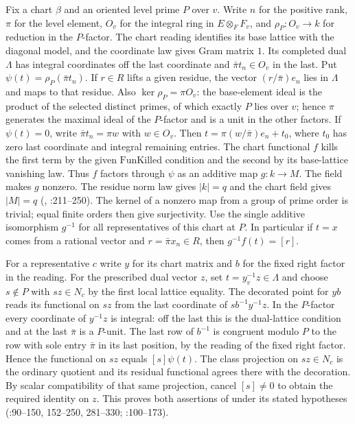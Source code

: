 Fix a chart $\beta$ and an oriented level prime $P$ over $v$.
Write $n$ for the positive rank, $\pi$ for the level element,
$O_v$ for the integral ring in $E\otimes_F F_v$, and
$\rho_P:O_v\to k$ for reduction in the $P$-factor.
The chart reading identifies its base lattice with the diagonal model,
and the coordinate law gives Gram matrix $1$. Its completed dual
$\Lambda$ has integral coordinates off the last coordinate and
$\bar\pi t_n\in O_v$ in the last. Put
$\psi(t)=\rho_P(\bar\pi t_n)$. If $r\in R$ lifts a given residue,
the vector $(r/\bar\pi)e_n$ lies in $\Lambda$ and maps to that residue.
Also $\ker\rho_P=\pi O_v$: the base-element ideal is the product
of the selected distinct primes, of which exactly $P$ lies over $v$;
hence $\pi$ generates the maximal ideal of the $P$-factor and is a
unit in the other factors. If $\psi(t)=0$, write
$\bar\pi t_n=\pi w$ with $w\in O_v$. Then
$t=\pi(w/\bar\pi)e_n+t_0$, where $t_0$ has zero last coordinate
and integral remaining entries. The chart functional $f$ kills the
first term by the given $\mathrm{FunKilled}$ condition and the second
by its base-lattice vanishing law. Thus $f$ factors through $\psi$
as an additive map $g:k\to M$. The field  makes $g$
nonzero. The residue norm law  gives $|k|=q$ and the
chart field  gives $|M|=q$ (,
:211--250). The kernel of a nonzero map
from a group of prime order is trivial; equal finite orders then give
surjectivity.
Use the single additive isomorphism $g^{-1}$ for all representatives
of this chart at $P$. In particular if $t=x$ comes from a rational
vector and $r=\bar\pi x_n\in R$, then $g^{-1}f(t)=[r]$.

For a representative $c$ write $y$ for its chart matrix and $b$ for
the fixed right factor in the reading. For the prescribed dual vector
$z$, set $t=y_v^{-1}z\in\Lambda$ and choose $s\notin P$ with
$sz\in N_c$ by the first local lattice equality. The decorated point
for $yb$ reads its functional on $sz$ from the last coordinate of
$s b^{-1}y^{-1}z$. In the $P$-factor every coordinate of $y^{-1}z$
is integral: off the last this is the dual-lattice condition and at
the last $\bar\pi$ is a $P$-unit. The last row of $b^{-1}$ is
congruent modulo $P$ to the row with sole entry $\bar\pi$ in its
last position, by the reading of the fixed right factor. Hence the
functional on $sz$ equals $[s]\psi(t)$. The class projection on
$sz\in N_c$ is the ordinary quotient and its residual functional
agrees there with the decoration. By scalar compatibility of that
same projection, cancel $[s]\ne0$ to obtain the required identity
on $z$. This proves both assertions of  under
its stated hypotheses (:90--150,
152--250, 281--330; :100--173).

